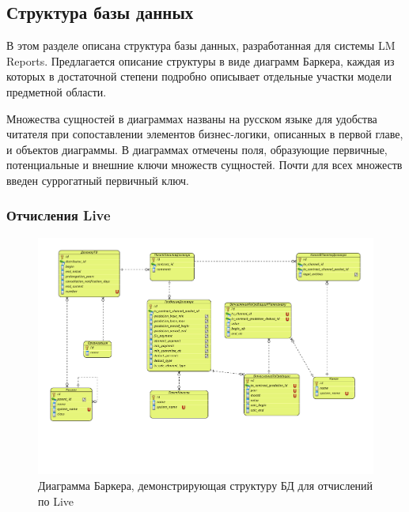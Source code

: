 \subsection{Структура базы данных}
В этом разделе описана структура базы данных, разработанная для системы LM Reports.
Предлагается описание структуры в виде диаграмм Баркера, каждая из которых в достаточной степени
подробно описывает отдельные участки модели предметной области. 

Множества сущностей в диаграммах названы на русском языке для удобства читателя при сопоставлении
элементов бизнес-логики, описанных в первой главе, и объектов диаграммы.
В диаграммах отмечены поля, образующие первичные, потенциальные и внешние ключи множеств сущностей. 
Почти для всех множеств введен суррогатный первичный ключ.

\subsubsection{Отчисления Live}

\begin{figure}[!ht]
\begin{center}
\vspace{-0.5cm}
\includegraphics[scale=0.65, trim=10mm 40mm 0mm 10mm, clip]{../resources/uml/TV_DEDUCT.pdf}
\caption{Диаграмма Баркера, демонстрирующая структуру БД для отчислений по Live}
\label{gr:tv_deduct}
\end{center} 
\end{figure}


